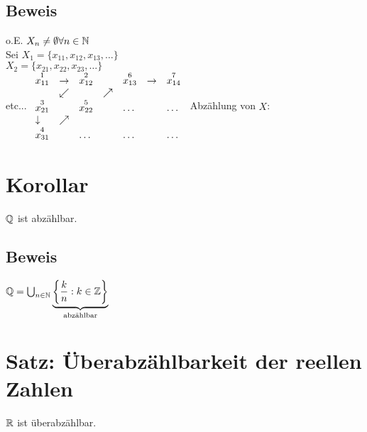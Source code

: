 \subsection*{Beweis}
o.E. $X_n \neq \emptyset \forall n \in \mathbb{N}$\\
Sei $X_1 = \{x_{11}, x_{12}, x_{13}, \ldots \}$\\
$X_2 = \{x_{21}, x_{22}, x_{23}, \ldots \}$\\
etc...\nl
$\begin{array}{l l l l l l l}
\overset{1}{x_{11}} & \rightarrow & \overset{2}{x_{12}} & \ & \overset{6}{x_{13}} & \rightarrow & \overset{7}{x_{14}} \\
\ & \swarrow & \ & \nearrow & \ & \ & \ \\
\overset{3}{x_{21}} & \ & \overset{5}{x_{22}} & \ & \ldots & \ & \ldots \\
\downarrow & \nearrow & \ & \ & \ & \ & \ \\
\overset{4}{x_{31}} & \ & \ldots & \ & \ldots & \ & \ldots
\end{array}$\nl
Abzählung von $X$: 

\section{Korollar}\label{8.6}
$\mathbb{Q}$ ist abzählbar.

\subsection*{Beweis}
$\mathbb{Q} = \bigcup_{n \in \mathbb{N}} \underbrace{\left\{\frac{k}{n}: k \in \mathbb{Z}\right\}}_{\text{abzählbar}}$ 

\newpage

\section{Satz: Überabzählbarkeit der reellen Zahlen}\label{8.7}
$\mathbb{R}$ ist überabzählbar.

{}
